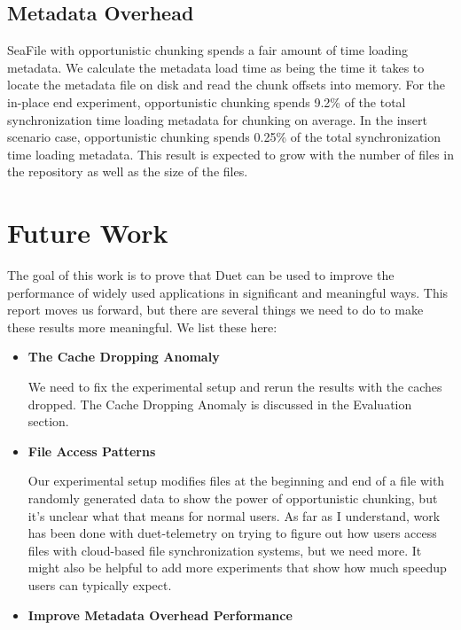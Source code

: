 \documentclass[table]{article}
\begin{document}
\begin{multicols}{2}
\subsection{Metadata Overhead}

SeaFile with opportunistic chunking spends a fair amount of time loading metadata. We calculate the metadata load time as being the time it takes to locate the metadata file on disk and read the chunk offsets into memory. For the in-place end experiment, opportunistic chunking spends 9.2\% of the total synchronization time loading metadata for chunking on average. In the insert scenario case, opportunistic chunking spends 0.25\% of the total synchronization time loading metadata. This result is expected to grow with the number of files in the repository as well as the size of the files.

\section{Future Work}

The goal of this work is to prove that Duet can be used to improve the performance of widely used applications in significant and meaningful ways. This report moves us forward, but there are several things we need to do to make these results more meaningful. We list these here:

\begin{itemize}
    \item \textbf{The Cache Dropping Anomaly}
    
        We need to fix the experimental setup and rerun the results with the caches dropped. The Cache Dropping Anomaly is discussed in the Evaluation section.
        
    \item \textbf{File Access Patterns}
    
        Our experimental setup modifies files at the beginning and end of a file with randomly generated data to show the power of opportunistic chunking, but it's unclear what that means for normal users. As far as I understand, work has been done with duet-telemetry on trying to figure out how users access files with cloud-based file synchronization systems, but we need more. It might also be helpful to add more experiments that show how much speedup users can typically expect.
        
    \item \textbf{Improve Metadata Overhead Performance}
        

\end{itemize}
\end{multicols}
\end{document}
